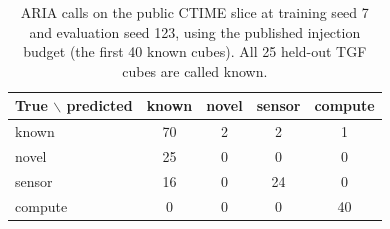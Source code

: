 \begin{table}[t]
\caption{ARIA calls on the public CTIME slice at training seed 7 and evaluation seed 123, using the published injection budget (the first 40 known cubes). All 25 held-out TGF cubes are called known.}
\label{tab:realconf}
\centering
\small
\begin{tabular}{lcccc}
\toprule
True $\backslash$ predicted & known & novel & sensor & compute \\
\midrule
known & 70 & 2 & 2 & 1 \\
novel & 25 & 0 & 0 & 0 \\
sensor & 16 & 0 & 24 & 0 \\
compute & 0 & 0 & 0 & 40 \\
\bottomrule
\end{tabular}
\end{table}
